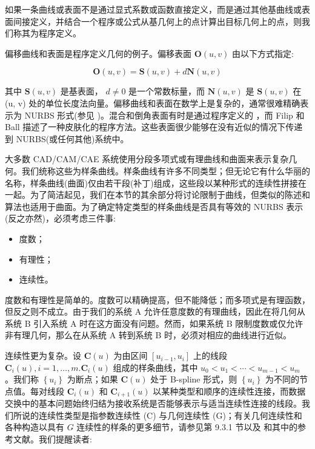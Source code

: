 \documentclass[../main.tex]{subfiles}
\begin{document}
如果一条曲线或表面不是通过显式系数或函数直接定义，而是通过其他基曲线或表面间接定义，并结合一个程序或公式从基几何上的点计算出目标几何上的点，则我们称其为程序定义。

偏移曲线和表面是程序定义几何的例子。偏移表面 \(\mathbf{O}\left( {u,v}\right)\) 由以下方式指定:

\[
\mathbf{O}\left( {u,v}\right)  = \mathbf{S}\left( {u,v}\right)  + d\mathbf{N}\left( {u,v}\right)  \tag{12.3}
\]

其中 \(\mathbf{S}\left( {u,v}\right)\) 是基表面， \(d \neq  0\) 是一个常数标量，而 \(\mathbf{N}\left( {u,v}\right)\) 是 \(\mathbf{S}\left( {u,v}\right)\) 在 (u, v) 处的单位长度法向量。偏移曲线和表面在数学上是复杂的，通常很难精确表示为 NURBS 形式(参见 \cite{Till84,Faro86,Coqu87b,Hosc88})。混合和倒角表面有时是通过程序定义的 \cite{Choi91}，而 Filip 和 Ball \cite{Fili89} 描述了一种皮肤化的程序方法。这些表面很少能够在没有近似的情况下传递到 NURBS(或任何其他)系统中。

大多数 CAD/CAM/CAE 系统使用分段多项式或有理曲线和曲面来表示复杂几何。我们统称这些为样条曲线。样条曲线有许多不同类型；但无论它有什么华丽的名称，样条曲线(曲面)仅由若干段(补丁)组成，这些段以某种形式的连续性拼接在一起。为了简洁起见，我们在本节的其余部分将讨论限制于曲线，但类似的陈述和算法也适用于曲面。为了确定特定类型的样条曲线是否具有等效的 NURBS 表示(反之亦然)，必须考虑三件事:

\begin{itemize}
\item 度数；
\end{itemize}

\begin{itemize}
\item 有理性；
\end{itemize}

\begin{itemize}
\item 连续性。
\end{itemize}

度数和有理性是简单的。度数可以精确提高，但不能降低；而多项式是有理函数，但反之则不成立。由于我们的系统 A 允许任意度数的有理曲线，因此在将几何从系统 B 引入系统 A 时在这方面没有问题。然而，如果系统 B 限制度数或仅允许非有理几何，那么在从系统 A 转到系统 B 时，必须对相应的曲线进行近似。

连续性更为复杂。设 \(\mathbf{C}\left( u\right)\) 为由区间 \(\left\lbrack  {{u}_{i - 1},{u}_{i}}\right\rbrack\) 上的线段 \({\mathbf{C}}_{i}\left( u\right) ,i = 1,\ldots ,m.{\mathbf{C}}_{i}\left( u\right)\) 组成的样条曲线，其中 \({u}_{0} < {u}_{1} < \cdots  < {u}_{m - 1} < {u}_{m}\) 。我们称 \(\left\{  {u}_{i}\right\}\) 为断点；如果 \(\mathbf{C}\left( u\right)\) 处于 B-spline 形式，则 \(\left\{  {u}_{i}\right\}\) 为不同的节点值。每对线段 \({\mathbf{C}}_{i}\left( u\right)\) 和 \({\mathbf{C}}_{i + 1}\left( u\right)\) 以某种类型和顺序的连续性连接，而数据交换中的基本问题始终归结为接收系统是否能够表示与适当连续性连接的线段。我们所说的连续性类型是指参数连续性 (C) 与几何连续性 (G)；有关几何连续性和各种构造以具有 \(G\) 连续性的样条的更多细节，请参见第 9.3.1 节以及 \cite{Bars89,Bars90,Hosc93} 和其中的参考文献。我们提醒读者:
\end{document}

